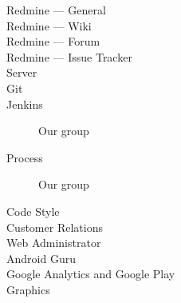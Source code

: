 \begin{description}
  \item[Redmine --- General] \dummy \dummy
  \item[Redmine --- Wiki] \dummy \dummy
  \item[Redmine --- Forum] \dummy
  \item[Redmine --- Issue Tracker] \dummy \dummy
  \item[Server] \dummy \dummy
  \item[Git] \dummy \dummy
  \item[Jenkins] Our group
  \item[Process] Our group
  \item[Code Style] \dummy \dummy
  \item[Customer Relations] 
  \item[Web Administrator] \dummy \dummy
  \item[Android Guru] \dummy \dummy
  \item[Google Analytics and Google Play] \dummy \dummy
  \item[Graphics] \dummy \dummy
\end{description}